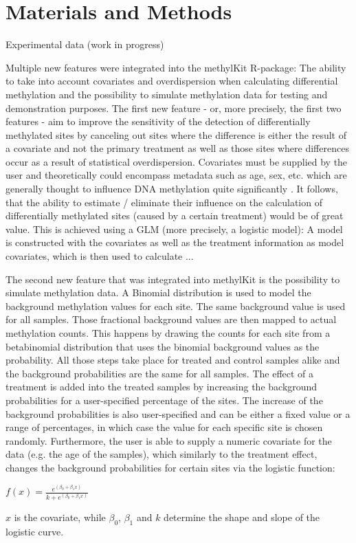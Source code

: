 \section{Materials and Methods}

Experimental data (work in progress)

Multiple new features were integrated into the methylKit R-package: The ability to take into account covariates and overdispersion when calculating differential methylation and the possibility to simulate methylation data for testing and demonstration purposes.
The first new feature - or, more precisely, the first two features - aim to  improve the sensitivity of the detection of differentially methylated sites by canceling out sites where the difference is either the result of a covariate and not the primary treatment as well as those sites where differences occur as a result of statistical overdispersion.
Covariates must be supplied by the user and theoretically could encompass metadata such as age, sex, etc. which are generally thought to influence DNA methylation quite significantly \cite{24561809}. It follows, that the ability to estimate / eliminate their influence on the calculation of differentially methylated sites (caused by a certain treatment) would be of great value.
This is achieved using a GLM (more precisely, a logistic model): A model is constructed with the covariates as well as the treatment information as model covariates, which is then used to calculate ...

The second new feature that was integrated into methylKit is the possibility to simulate methylation data.
A Binomial distribution is used to model the background methylation values for each site. The same background value is used for all samples.
Those fractional background values are then mapped to actual methylation counts. This happens by drawing the counts for each site from a betabinomial distribution that uses the binomial background values as the probability.
All those steps take place for treated and control samples alike and the background probabilities are the same for all samples.
The effect of a treatment is added into the treated samples by increasing the background probabilities for a user-specified percentage of the sites. The increase of the background probabilities is also user-specified and can be either a fixed value or a range of percentages, in which case the value for each specific site is chosen randomly.
Furthermore, the user is able to supply a numeric covariate for the data (e.g. the age of the samples), which similarly to the treatment effect, changes the background probabilities for certain sites via the logistic function:

$f(x) = \frac{e^{(\beta_{0} + \beta_{1}x)}}{k+e^{(\beta_{0} + \beta_{1}x)}}$

$x$ is the covariate, while $\beta_{0}$, $\beta_{1}$ and $k$ determine the shape and slope of the logistic curve.
  
  
  
